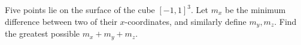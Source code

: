 Five points lie on the surface of the cube $[-1,1]^3$. Let $m_x$ be the minimum difference between two of their $x$-coordinates, and similarly define $m_y,m_z$. Find the greatest possible $m_x+m_y+m_z$.
